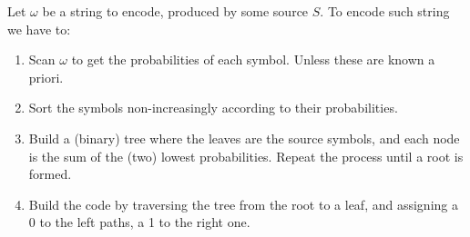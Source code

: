 \documentclass{subfiles}
\begin{document}
 
    Let \(\omega\) be a string to encode, 
    produced by some source \(S\).
    To encode such string we have to:
        \begin{enumerate}
            \item Scan \(\omega\) to get the probabilities of each symbol.
                Unless these are known a priori.
            \item Sort the symbols non-increasingly according to their probabilities.
            \item Build a (binary) tree where the leaves are the source symbols,
                and each node is the sum of the (two) lowest probabilities.
                Repeat the process until a root is formed.
            \item Build the code by traversing the tree from the root to a leaf,
                and assigning a 0 to the left paths, a 1 to the right one.
        \end{enumerate}
\end{document}
